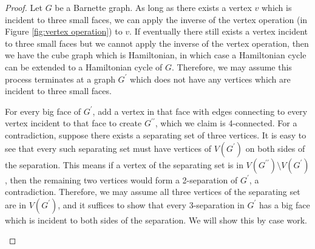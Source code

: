 \documentclass{scrartcl}
\theoremstyle{definition}
\theoremstyle{plain}
\begin{document}
\begin{proof}
    Let $G$ be a Barnette graph.
    As long as there exists a vertex $v$ which is incident to three small faces, we can apply the
    inverse of the vertex operation (in Figure \ref{fig:vertex operation}) to $v$.
    If eventually there still exists a vertex incident to three small faces but we cannot apply the
    inverse of the vertex operation, then we have the cube graph which is Hamiltonian, in which
    case a Hamiltonian cycle can be extended to a Hamiltonian cycle of $G$.
    Therefore, we may assume this process terminates at a graph $G^\prime$ which does not have any
    vertices which are incident to three small faces.

    For every big face of $G^\prime$, add a vertex in that face with edges connecting to every
    vertex incident to that face to create $G^{\prime\prime}$, which we claim is 4-connected.
    For a contradiction, suppose there exists a separating set of three vertices.
    It is easy to see that every such separating set must have vertices of $V(G^\prime)$ on both
    sides of the separation.
    This means if a vertex of the separating set is in $V(G^{\prime\prime})\setminus V(G^\prime)$,
    then the remaining two vertices would form a 2-separation of $G^\prime$, a contradiction.
    Therefore, we may assume all three vertices of the separating set are in $V(G^\prime)$, and it
    suffices to show that every 3-separation in $G^\prime$ has a big face which is incident to both
    sides of the separation.
    We will show this by case work.
    \begin{figure}[hb]
        \centering
        \begin{minipage}{0.33\textwidth}
            \centering
\end{minipage}
\end{figure}
\end{proof}
\end{document}
